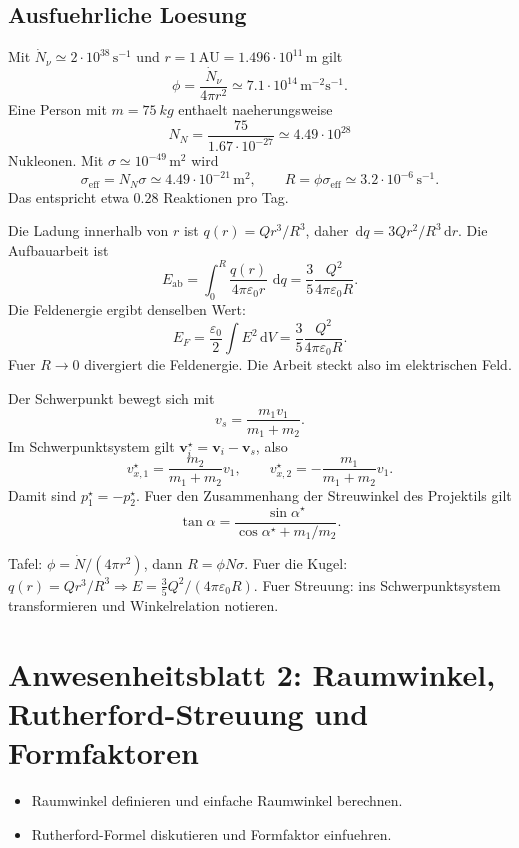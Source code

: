 \documentclass[11pt,a4paper]{scrartcl}
\newcommand{\dd}{\,\mathrm{d}}
\newcommand{\vect}[1]{\bm{#1}}
\begin{document}
\subsection{Ausfuehrliche Loesung}
\begin{calculationbox}[title={Diskussionsaufgabe: Sonnenneutrinos}]
Mit \(\dot N_\nu\simeq 2\cdot10^{38}\,\mathrm{s}^{-1}\) und \(r=1\,\mathrm{AU}=1.496\cdot10^{11}\,\mathrm{m}\) gilt
\[\phi=\frac{\dot N_\nu}{4\pi r^2}\simeq 7.1\cdot10^{14}\,\mathrm{m}^{-2}\mathrm{s}^{-1} .\]
Eine Person mit \(m=\SI{75}{kg}\) enthaelt naeherungsweise
\[N_N=\frac{75}{1.67\cdot10^{-27}}\simeq 4.49\cdot10^{28}\]
Nukleonen. Mit \(\sigma\simeq10^{-49}\,\mathrm{m^2}\) wird
\[\sigma_{\mathrm{eff}}=N_N\sigma\simeq4.49\cdot10^{-21}\,\mathrm{m^2},\qquad R=\phi\sigma_{\mathrm{eff}}\simeq3.2\cdot10^{-6}\,\mathrm{s}^{-1}.\]
Das entspricht etwa \(0.28\) Reaktionen pro Tag.
\end{calculationbox}
\begin{calculationbox}[title={Homogen geladene Kugel}]
Die Ladung innerhalb von \(r\) ist \(q(r)=Q r^3/R^3\), daher \(\dd q=3Q r^2/R^3\dd r\). Die Aufbauarbeit ist
\[E_{\mathrm{ab}}=\int_0^R \frac{q(r)}{4\pi\varepsilon_0 r}\,\dd q=\frac{3}{5}\frac{Q^2}{4\pi\varepsilon_0R}.\]
Die Feldenergie ergibt denselben Wert:
\[E_F=\frac{\varepsilon_0}{2}\int E^2\dd V=\frac{3}{5}\frac{Q^2}{4\pi\varepsilon_0R}.\]
Fuer \(R\to0\) divergiert die Feldenergie. Die Arbeit steckt also im elektrischen Feld.
\end{calculationbox}
\begin{calculationbox}[title={Streuprozess}]
Der Schwerpunkt bewegt sich mit
\[v_s=\frac{m_1v_1}{m_1+m_2}.\]
Im Schwerpunktsystem gilt \(\vect v_i^\star=\vect v_i-\vect v_s\), also
\[v_{x,1}^\star=\frac{m_2}{m_1+m_2}v_1,\qquad v_{x,2}^\star=-\frac{m_1}{m_1+m_2}v_1.\]
Damit sind \(p_1^\star=-p_2^\star\). Fuer den Zusammenhang der Streuwinkel des Projektils gilt
\[\tan\alpha=\frac{\sin\alpha^\star}{\cos\alpha^\star+m_1/m_2}.\]
\end{calculationbox}
\begin{talkbox}Tafel: \(\phi=\dot N/(4\pi r^2)\), dann \(R=\phi N\sigma\). Fuer die Kugel: \(q(r)=Qr^3/R^3\Rightarrow E=\frac35Q^2/(4\pi\varepsilon_0R)\). Fuer Streuung: ins Schwerpunktsystem transformieren und Winkelrelation notieren.\end{talkbox}


\section{Anwesenheitsblatt 2: Raumwinkel, Rutherford-Streuung und Formfaktoren}
\begin{taskbox}\begin{itemize}\item Raumwinkel definieren und einfache Raumwinkel berechnen.\item Rutherford-Formel diskutieren und Formfaktor einfuehren.\end{itemize}\end{taskbox}
\end{document}
